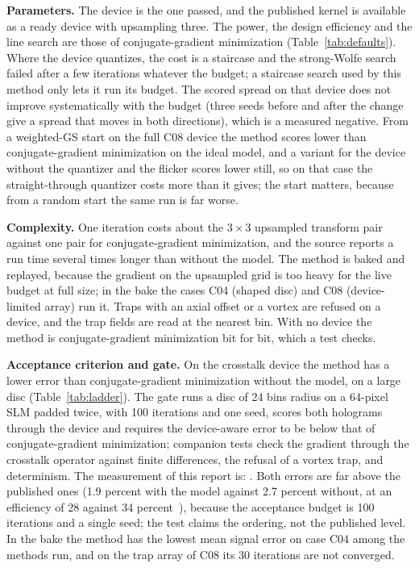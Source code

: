 \textbf{Parameters.} The device is the one passed, and the published kernel is available as a ready device with upsampling three. The power, the design efficiency and the line search are those of conjugate-gradient minimization (Table~\ref{tab:defaults}). Where the device quantizes, the cost is a staircase and the strong-Wolfe search failed after a few iterations whatever the budget; a staircase search used by this method only lets it run its budget. The scored spread on that device does not improve systematically with the budget (three seeds before and after the change give a spread that moves in both directions), which is a measured negative. From a weighted-GS start on the full C08 device the method scores lower than conjugate-gradient minimization on the ideal model, and a variant for the device without the quantizer and the flicker scores lower still, so on that case the straight-through quantizer costs more than it gives; the start matters, because from a random start the same run is far worse.

\textbf{Complexity.} One iteration costs about the $3\times3$ upsampled transform pair against one pair for conjugate-gradient minimization, and the source reports a run time several times longer than without the model. The method is baked and replayed, because the gradient on the upsampled grid is too heavy for the live budget at full size; in the bake the cases C04 (shaped disc) and C08 (device-limited array) run it. Traps with an axial offset or a vortex are refused on a device, and the trap fields are read at the nearest bin. With no device the method is conjugate-gradient minimization bit for bit, which a test checks.

\textbf{Acceptance criterion and gate.} On the crosstalk device the method has a lower error than conjugate-gradient minimization without the model, on a large disc (Table~\ref{tab:ladder}). The gate runs a disc of 24 bins radius on a $64$-pixel SLM padded twice, with 100 iterations and one seed, scores both holograms through the device and requires the device-aware error to be below that of conjugate-gradient minimization; companion tests check the gradient through the crosstalk operator against finite differences, the refusal of a vortex trap, and determinism. The measurement of this report is: . Both errors are far above the published ones (1.9 percent with the model against 2.7 percent without, at an efficiency of 28 against 34 percent~\cite{schroff}), because the acceptance budget is 100 iterations and a single seed; the test claims the ordering, not the published level. In the bake the method has the lowest mean signal error on case C04 among the methods run, and on the trap array of C08 its 30 iterations are not converged.

